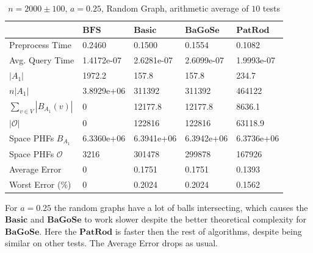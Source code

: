 \documentclass[shortabstract, lic, english]{iithesis}
\theoremstyle{definition} \newtheorem{definition}{Definition}[chapter]
\theoremstyle{plain} \newtheorem{remark}[definition]{Observation}
\theoremstyle{plain} \newtheorem{theorem}[definition]{Theorem}
\theoremstyle{plain} \newtheorem{lemma}[definition]{Lemma}
\theoremstyle{plain} \newtheorem{conjecture}[definition]{Conjecture}
\begin{document}
\begin{table}[H] \label{test:random.a0.25}
    \centering
    \begin{tabular}{ |p{3cm}||p{2cm}|p{2cm}|p{2cm}|p{2cm}|  } 
        \hline
        & $\mathbf{BFS}$ & $\mathbf{Basic}$ & $\mathbf{BaGoSe}$ & $\mathbf{PatRod}$ \\
        \hline
        \hline
        Preprocess Time                 & 0.2460     & 0.1500     & 0.1554      & 0.1082     \\
        \hline
        Avg. Query Time                 & 1.4172e-07 & 2.6281e-07 & 2.6099e-07  & 1.9993e-07 \\
        \hline
        $|A_1|$                         & 1972.2     & 157.8      & 157.8       & 234.7      \\
        \hline
        $n |A_1|$                       & 3.8929e+06 & 311392     & 311392      & 464122     \\
        \hline
        $\sum_{v \in V} |B_{A_1}(v)| $  & 0          & 12177.8    & 12177.8     & 8636.1     \\
        \hline
        $|\mathcal{O}|$                 & 0          & 122816     & 122816      & 63118.9    \\
        \hline
        Space PHFs $B_{A_1}$            & 6.3360e+06 & 6.3941e+06 & 6.3942e+06  & 6.3736e+06 \\
        \hline
        Space PHFs $\mathcal{O}$        & 3216       & 301478     & 299878      & 167926     \\
        \hline
        Average Error                   & 0          & 0.1751     & 0.1751      & 0.1393     \\
        \hline
        Worst Error (\%)                & 0          & 0.2024     & 0.2024      & 0.1562     \\
        \hline

    \end{tabular}
    \caption{$n = 2000 \pm 100$, $a = 0.25$, Random Graph, arithmetic average of $10$ tests}
\end{table}

For $a = 0.25$ the random graphs have a lot of balls intersecting, which causes the $\mathbf{Basic}$ and $\mathbf{BaGoSe}$
to work slower despite the better theoretical complexity for $\mathbf{BaGoSe}$.
Here the $\mathbf{PatRod}$ is faster then the rest of algorithms, despite being similar on other tests.
The Average Error drops as usual.
\end{document}
